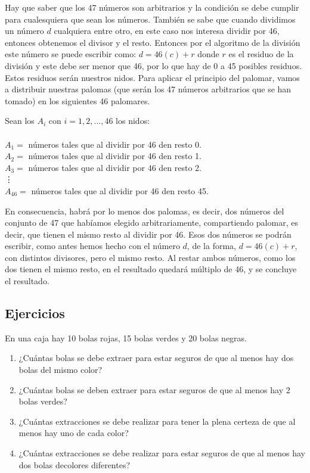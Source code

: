 \documentclass[12pt]{article}
\begin{document}
\begin{solucion}
    Hay que saber que los 47 números son arbitrarios y la condición se debe cumplir para cualesquiera que sean los números. También se sabe que cuando dividimos un número $d$ cualquiera entre otro, en este caso nos interesa dividir por 46, entonces obtenemos el divisor y el resto.  Entonces por el algoritmo de la división este número se puede escribir como: $d=46(c)+r$ donde $r$ es el residuo de la división y este debe ser menor que 46, por lo que hay de 0 a 45 posibles residuos.  Estos residuos serán nuestros nidos. Para aplicar el principio del palomar, vamos a distribuir nuestras palomas (que serán los 47 números arbitrarios que se han tomado) en los siguientes 46 palomares.

    Sean los $A_i$ con $i=1,2,...,46$ los nidos: \\ \\
    $A_1 =$ números tales que al dividir por 46 den resto 0. \\
    $A_2 =$ números tales que al dividir por 46 den resto 1. \\
    $A_3 =$ números tales que al dividir por 46 den resto 2. \\
    \phantom{.} \vdots \\
    $A_{46} =$ números tales que al dividir por 46 den resto 45.

    En consecuencia, habrá por lo menos dos palomas, es decir, dos n\'umeros del conjunto de 47 que habíamos elegido arbitrariamente, compartiendo palomar, es decir, que tienen el mismo resto al dividir por 46. Esos dos números se podrán escribir, como antes hemos hecho con el número $d$, de la forma, $d=46(c)+r$, con distintos divisores, pero el mismo resto. Al restar ambos números, como los dos tienen el mismo resto, en el resultado quedará múltiplo de 46, y se concluye el resultado.
\end{solucion}

\subsection{Ejercicios}

\begin{problema}
    En una caja hay 10 bolas rojas, 15 bolas verdes y 20 bolas negras.

    \renewcommand{\labelenumi}{\alph{enumi})}
    \begin{enumerate}
        \item ¿Cuántas bolas se debe extraer para estar seguros de que al menos hay dos bolas del mismo color?
        \item ¿Cuántas bolas se deben extraer para estar seguros de que al menos hay 2 bolas verdes?
        \item ¿Cuántas extracciones se debe realizar para tener la plena certeza de que al menos hay uno de cada color?
        \item ¿Cuántas extracciones se debe realizar para estar seguros de que al menos hay dos bolas decolores diferentes?
    \end{enumerate}
\end{problema}
\end{document}
